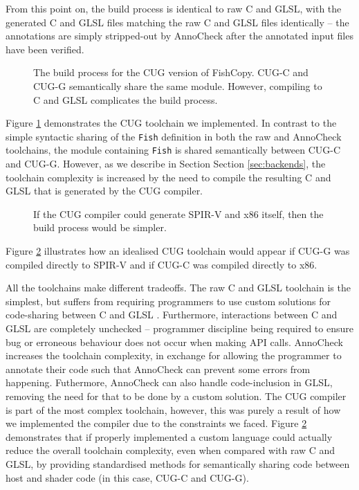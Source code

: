 \documentclass[a4paper,12pt,twoside,openright]{report}
\begin{document}
From this point on, the build process is identical to raw C and GLSL, with the
generated C and GLSL files matching the raw C and GLSL files identically -- the
annotations are simply stripped-out by AnnoCheck after the annotated input
files have been verified.

\begin{figure}[h]
\centering
\def\svgwidth{0.8\linewidth}

\caption{The build process for the CUG version of FishCopy. CUG-C and CUG-G
semantically share the same module. However, compiling to C and GLSL
complicates the build process.}
\label{fig:pipeline_cug}
\end{figure}

Figure \ref{fig:pipeline_cug} demonstrates the CUG toolchain we implemented. In
contrast to the simple syntactic sharing of the \texttt{Fish} definition in
both the raw and AnnoCheck toolchains, the module containing \texttt{Fish} is
shared semantically between CUG-C and CUG-G. However, as we describe in Section
Section \ref{sec:backends}, the toolchain complexity is increased by the need
to compile the resulting C and GLSL that is generated by the CUG compiler.

\begin{figure}[h]
\centering
\def\svgwidth{0.8\linewidth}

\caption{If the CUG compiler could generate SPIR-V and x86 itself, then the build
process would be simpler.}
\label{fig:pipeline_cug_future}
\end{figure}

Figure \ref{fig:pipeline_cug_future} illustrates how an idealised CUG toolchain
would appear if CUG-G was compiled directly to SPIR-V and if CUG-C was compiled
directly to x86.

All the toolchains make different tradeoffs. The raw C and GLSL toolchain is
the simplest, but suffers from requiring programmers to use custom solutions
for code-sharing between C and GLSL \cite{NoIncludeGLSL}. Furthermore,
interactions between C and GLSL are completely unchecked -- programmer
discipline being required to ensure bug or erroneous behaviour does not occur
when making API calls. AnnoCheck increases the toolchain complexity, in
exchange for allowing the programmer to annotate their code such that AnnoCheck
can prevent some errors from happening. Futhermore, AnnoCheck can also handle
code-inclusion in GLSL, removing the need for that to be done by a custom
solution. The CUG compiler is part of the most complex toolchain, however, this
was purely a result of how we implemented the compiler due to the constraints
we faced. Figure \ref{fig:pipeline_cug_future} demonstrates that if properly
implemented a custom language could actually reduce the overall toolchain
complexity, even when compared with raw C and GLSL, by providing standardised
methods for semantically sharing code between host and shader code (in this
case, CUG-C and CUG-G).
\end{document}
